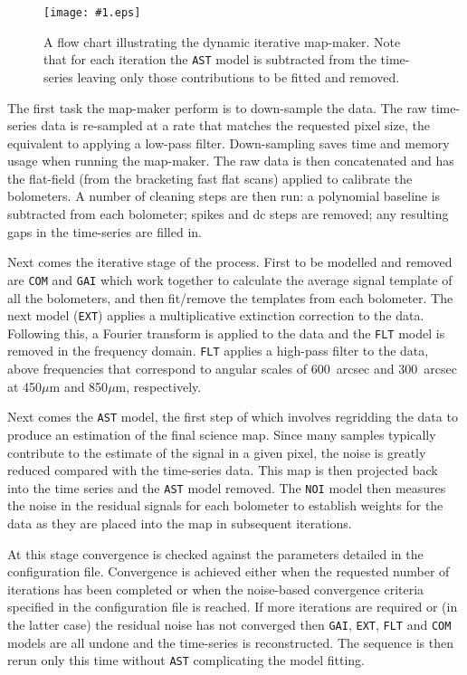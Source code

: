 \documentclass[twoside,11pt]{article}
\newcommand{\htmladdimg}[1]{}
\renewcommand{\_}{\texttt{\symbol{95}}}
\newcommand{\myfig}[5]{
  \begin{figure}#2
    \centering\texttt{[image: \#1.eps]}
    \typeout{#1.eps inserted on page \arabic{page}}
    \caption{\label{#4}\small #5}
  \end{figure}
}
\newcommand{\myfig}[5]{
    \label{#4} \htmladdimg{#1.png}\\
    \\
    Figure: #5\\
  }
\begin{document}
\myfig{sc21_flow_dimm_blue}{}{width=0.78\linewidth}{fig:dimm}{
  A flow chart illustrating the dynamic iterative map-maker. Note that
  for each iteration the \texttt{AST} model is subtracted from the
  time-series leaving only those contributions to be fitted and
  removed.}

The first task the map-maker perform is to down-sample the data. The
raw time-series data is re-sampled at a rate that matches the
requested pixel size, the equivalent to applying a low-pass filter.
Down-sampling saves time and memory usage when running the map-maker.
The raw data is then concatenated and has the flat-field (from the
bracketing fast flat scans) applied to calibrate the bolometers. A
number of cleaning steps are then run: a polynomial baseline is
subtracted from each bolometer; spikes and dc steps are removed; any
resulting gaps in the time-series are filled in.

Next comes the iterative stage of the process. First to be modelled
and removed are \texttt{COM} and \texttt{GAI} which work together to
calculate the average signal template of all the bolometers, and then
fit/remove the templates from each bolometer. The next model
(\texttt{EXT}) applies a multiplicative extinction correction to the
data.  Following this, a Fourier transform is applied to the data and
the \texttt{FLT} model is removed in the frequency domain.
\texttt{FLT} applies a high-pass filter to the data, above frequencies
that correspond to angular scales of 600~arcsec and 300~arcsec at
450$\mu$m and 850$\mu$m, respectively.

Next comes the \texttt{AST} model, the first step of which involves
regridding the data to produce an estimation of the final science map.
Since many samples typically contribute to the estimate of the signal
in a given pixel, the noise is greatly reduced compared with the
time-series data. This map is then projected back into the time series
and the \texttt{AST} model removed. The \texttt{NOI} model then
measures the noise in the residual signals for each bolometer to
establish weights for the data as they are placed into the map in
subsequent iterations.

At this stage convergence is checked against the parameters detailed
in the configuration file.  Convergence is achieved either when the
requested number of iterations has been completed or when the
noise-based convergence criteria specified in the configuration file
is reached. If more iterations are required or (in the latter case)
the residual noise has not converged then \texttt{GAI}, \texttt{EXT},
\texttt{FLT} and \texttt{COM} models are all undone and the
time-series is reconstructed. The sequence is then rerun only this
time without \texttt{AST} complicating the model fitting.
\end{document}
